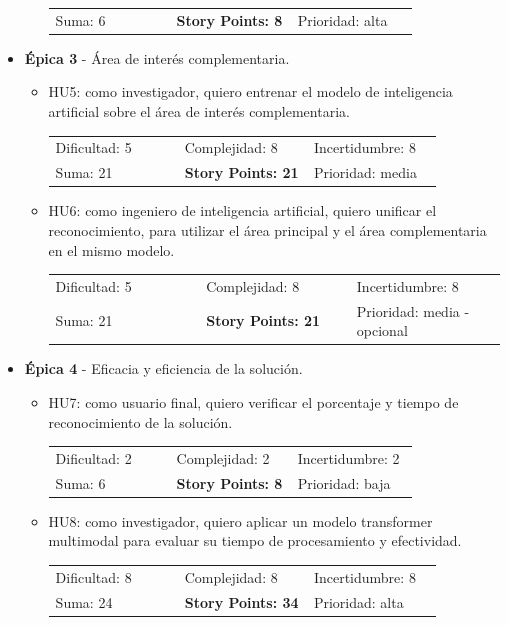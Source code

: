 \documentclass[
11pt, %
]{charter}
\begin{document}
\begin{itemize}
\begin{itemize}
\begin{tabular}{p{0.33\linewidth} p{0.33\linewidth} p{0.33\linewidth}}
      Suma: 6		& \textbf{Story Points: 8} & Prioridad: alta \\
      \end{tabular}
    \end{itemize}
  \item \textbf{\'{E}pica 3} - Área de interés complementaria.
    \begin{itemize}
      \item HU5: como investigador, quiero entrenar el modelo de inteligencia artificial sobre el área de interés complementaria. \\
      \begin{tabular}{p{0.33\linewidth} p{0.33\linewidth} p{0.33\linewidth}}
      Dificultad: 5	& Complejidad: 8 & Incertidumbre: 8 \\
      Suma: 21		& \textbf{Story Points: 21} & Prioridad: media \\
      \end{tabular}
      \item HU6: como ingeniero de inteligencia artificial, quiero unificar el reconocimiento, para utilizar el área principal y el área complementaria en el mismo modelo. \\
      \begin{tabular}{p{0.33\linewidth} p{0.33\linewidth} p{0.33\linewidth}}
      Dificultad: 5	& Complejidad: 8 & Incertidumbre: 8 \\
      Suma: 21		& \textbf{Story Points: 21} & Prioridad: media - opcional \\
      \end{tabular}
    \end{itemize}
\newpage
  \item \textbf{\'{E}pica 4} - Eficacia y eficiencia de la solución.
    \begin{itemize}
      \item HU7: como usuario final, quiero verificar el porcentaje y tiempo de reconocimiento de la solución. \\
      \begin{tabular}{p{0.33\linewidth} p{0.33\linewidth} p{0.33\linewidth}}
      Dificultad: 2	& Complejidad: 2 & Incertidumbre: 2 \\
      Suma: 6		& \textbf{Story Points: 8} & Prioridad: baja \\
      \end{tabular}
      \item HU8: como investigador, quiero aplicar un modelo transformer multimodal para evaluar su tiempo de procesamiento y efectividad. \\
      \begin{tabular}{p{0.33\linewidth} p{0.33\linewidth} p{0.33\linewidth}}
      Dificultad: 8	& Complejidad: 8 & Incertidumbre: 8 \\
      Suma: 24		& \textbf{Story Points: 34} & Prioridad: alta \\
      \end{tabular}
    \end{itemize}
\end{itemize}
\end{document}
